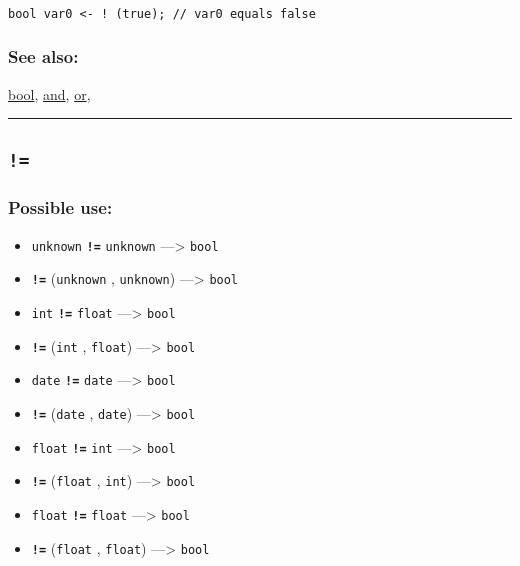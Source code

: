 \documentclass[]{book}
\providecommand{\tightlist}{%
  \setlength{\itemsep}{0pt}\setlength{\parskip}{0pt}}
\theoremstyle{definition}
\theoremstyle{definition}
\theoremstyle{definition}
\theoremstyle{remark}
\begin{document}
\begin{verbatim}
 
bool var0 <- ! (true); // var0 equals false
\end{verbatim}

\subsubsection{See also:}\label{see-also-2}

\href{operators-b-to-c.html\#bool}{bool},
\href{operators-a-to-a.html\#and}{and},
\href{operators-n-to-r.html\#or}{or},

\begin{center}\rule{0.5\linewidth}{\linethickness}\end{center}

\subsection{\texorpdfstring{\texttt{!=}}{!=}}\label{section-5}

\subsubsection{Possible use:}\label{possible-use-4}

\begin{itemize}
\tightlist
\item
  \texttt{unknown} \textbf{\texttt{!=}} \texttt{unknown}
  ---\textgreater{} \texttt{bool}
\item
  \textbf{\texttt{!=}} (\texttt{unknown} , \texttt{unknown})
  ---\textgreater{} \texttt{bool}
\item
  \texttt{int} \textbf{\texttt{!=}} \texttt{float} ---\textgreater{}
  \texttt{bool}
\item
  \textbf{\texttt{!=}} (\texttt{int} , \texttt{float}) ---\textgreater{}
  \texttt{bool}
\item
  \texttt{date} \textbf{\texttt{!=}} \texttt{date} ---\textgreater{}
  \texttt{bool}
\item
  \textbf{\texttt{!=}} (\texttt{date} , \texttt{date}) ---\textgreater{}
  \texttt{bool}
\item
  \texttt{float} \textbf{\texttt{!=}} \texttt{int} ---\textgreater{}
  \texttt{bool}
\item
  \textbf{\texttt{!=}} (\texttt{float} , \texttt{int}) ---\textgreater{}
  \texttt{bool}
\item
  \texttt{float} \textbf{\texttt{!=}} \texttt{float} ---\textgreater{}
  \texttt{bool}
\item
  \textbf{\texttt{!=}} (\texttt{float} , \texttt{float})
  ---\textgreater{} \texttt{bool}
\end{itemize}
\end{document}
